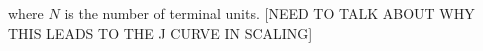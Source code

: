 \documentclass[12pt]{article}
\begin{document}
\noindent where $N$ is the number of terminal units. [NEED TO TALK ABOUT WHY
THIS LEADS TO THE J CURVE IN SCALING]









\end{document}
